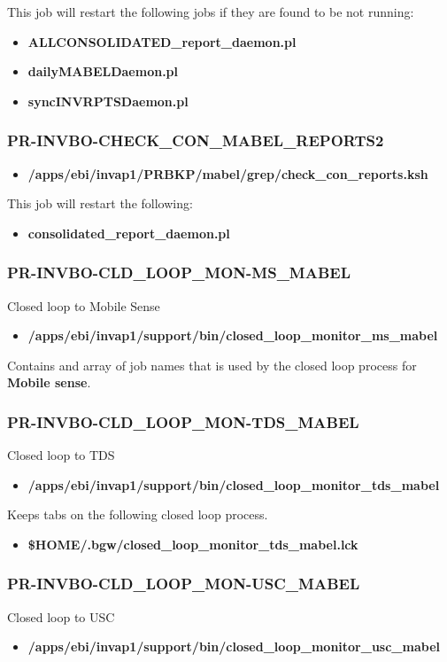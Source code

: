 \documentclass[12pt,twoside]{article}
\begin{document}
This job will restart the following jobs if they are found to be not running:
\begin{itemize}
\item \textbf{ALLCONSOLIDATED\_report\_daemon.pl}
\item \textbf{dailyMABELDaemon.pl}
\item \textbf{syncINVRPTSDaemon.pl}
\end{itemize}
\subsubsection{PR-INVBO-CHECK\_CON\_MABEL\_REPORTS2}
\label{sec:orgheadline46}
\begin{itemize}
\item \textbf{/apps/ebi/invap1/PRBKP/mabel/grep/check\_con\_reports.ksh}
\end{itemize}

This job will restart the following:
\begin{itemize}
\item \textbf{consolidated\_report\_daemon.pl}
\end{itemize}
\subsubsection{PR-INVBO-CLD\_LOOP\_MON-MS\_MABEL}
\label{sec:orgheadline47}
Closed loop to Mobile Sense
\begin{itemize}
\item \textbf{/apps/ebi/invap1/support/bin/closed\_loop\_monitor\_ms\_mabel}
\end{itemize}

Contains and array of job names that is used by the closed loop process for \textbf{Mobile sense}.
\subsubsection{PR-INVBO-CLD\_LOOP\_MON-TDS\_MABEL}
\label{sec:orgheadline48}
Closed loop to TDS
\begin{itemize}
\item \textbf{/apps/ebi/invap1/support/bin/closed\_loop\_monitor\_tds\_mabel}
\end{itemize}

Keeps tabs on the following closed loop process.
\begin{itemize}
\item \textbf{\$HOME/.bgw/closed\_loop\_monitor\_tds\_mabel.lck}
\end{itemize}
\subsubsection{PR-INVBO-CLD\_LOOP\_MON-USC\_MABEL}
\label{sec:orgheadline49}
Closed loop to USC
\begin{itemize}
\item \textbf{/apps/ebi/invap1/support/bin/closed\_loop\_monitor\_usc\_mabel}
\end{itemize}
\end{document}
